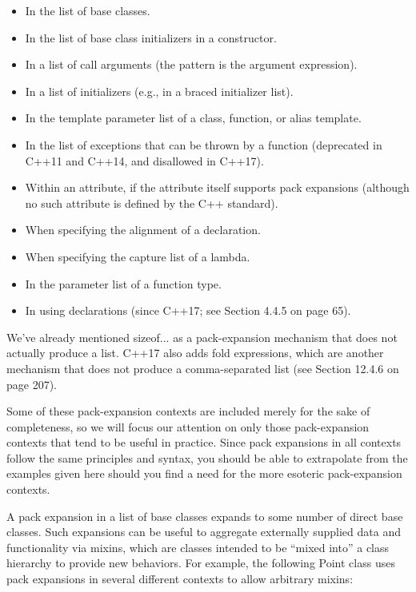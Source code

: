 \begin{itemize}
\item 
In the list of base classes.

\item 
In the list of base class initializers in a constructor.

\item 
In a list of call arguments (the pattern is the argument expression).

\item 
In a list of initializers (e.g., in a braced initializer list).

\item 
In the template parameter list of a class, function, or alias template.

\item 
In the list of exceptions that can be thrown by a function (deprecated in C++11 and C++14, and disallowed in C++17).

\item 
Within an attribute, if the attribute itself supports pack expansions (although no such attribute is defined by the C++ standard).

\item 
When specifying the alignment of a declaration.

\item 
When specifying the capture list of a lambda.

\item 
In the parameter list of a function type.

\item 
In using declarations (since C++17; see Section 4.4.5 on page 65).
\end{itemize}

We’ve already mentioned sizeof... as a pack-expansion mechanism that does not actually produce a list. C++17 also adds fold expressions, which are another mechanism that does not produce a comma-separated list (see Section 12.4.6 on page 207).

Some of these pack-expansion contexts are included merely for the sake of completeness, so we will focus our attention on only those pack-expansion contexts that tend to be useful in practice. Since pack expansions in all contexts follow the same principles and syntax, you should be able to extrapolate from the examples given here should you find a need for the more esoteric pack-expansion contexts.

A pack expansion in a list of base classes expands to some number of direct base classes. Such expansions can be useful to aggregate externally supplied data and functionality via mixins, which are classes intended to be “mixed into” a class hierarchy to provide new behaviors. For example, the following Point class uses pack expansions in several different contexts to allow arbitrary mixins:

